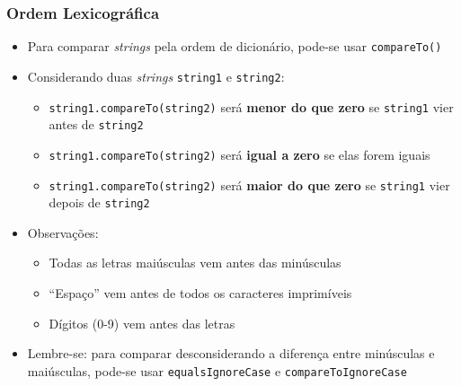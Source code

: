 \documentclass[xcolor={dvipsnames,table},aspectratio=169]{beamer}
\begin{document}
\begin{frame}\frametitle{Ordem Lexicográfica}
\begin{itemize}
	\item Para comparar \emph{strings} pela ordem de dicionário, pode-se usar \texttt{compareTo()}
	\item Considerando duas \emph{strings} \texttt{string1} e \texttt{string2}:
	\begin{itemize}
		\item \texttt{string1.compareTo(string2)} será \textbf{menor do que zero} se \texttt{string1} vier antes de \texttt{string2}
		\item \texttt{string1.compareTo(string2)} será \textbf{igual a zero} se elas forem iguais
		\item \texttt{string1.compareTo(string2)} será \textbf{maior do que zero} se \texttt{string1} vier depois de \texttt{string2}
	\end{itemize}
	\item Observações:
	\begin{itemize}
		\item Todas as letras maiúsculas vem antes das minúsculas
		\item ``Espaço'' vem antes de todos os caracteres imprimíveis
		\item Dígitos (0-9) vem antes das letras
	\end{itemize}
	\item Lembre-se: para comparar desconsiderando a diferença entre minúsculas e maiúsculas, pode-se usar \texttt{equalsIgnoreCase} e \texttt{compareToIgnoreCase}
\end{itemize}
\end{frame}
\end{document}
